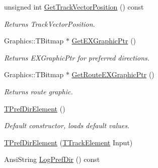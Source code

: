 \begin{DoxyCompactItemize}
\mbox{\label{class_t_pref_dir_element_a0edec31fc9787847e3b6240bab91783c}} 
unsigned int \mbox{\hyperlink{class_t_pref_dir_element_a0edec31fc9787847e3b6240bab91783c}{Get\+Track\+Vector\+Position}} () const
\begin{DoxyCompactList}\small\item\em Returns Track\+Vector\+Position. \end{DoxyCompactList}\item 
\mbox{\label{class_t_pref_dir_element_a9fd01c7c6774198d7efe2c9e60ab59bf}} 
Graphics\+::\+T\+Bitmap $\ast$ \mbox{\hyperlink{class_t_pref_dir_element_a9fd01c7c6774198d7efe2c9e60ab59bf}{Get\+E\+X\+Graphic\+Ptr}} ()
\begin{DoxyCompactList}\small\item\em Returns E\+X\+Graphic\+Ptr for preferred directions. \end{DoxyCompactList}\item 
\mbox{\label{class_t_pref_dir_element_a9dfc04bfa3abf32eb043d771381f971a}} 
Graphics\+::\+T\+Bitmap $\ast$ \mbox{\hyperlink{class_t_pref_dir_element_a9dfc04bfa3abf32eb043d771381f971a}{Get\+Route\+E\+X\+Graphic\+Ptr}} ()
\begin{DoxyCompactList}\small\item\em Returns route graphic. \end{DoxyCompactList}\item 
\mbox{\label{class_t_pref_dir_element_ab65391b0967a01b2d1b6450ff5ee85a7}} 
\mbox{\hyperlink{class_t_pref_dir_element_ab65391b0967a01b2d1b6450ff5ee85a7}{T\+Pref\+Dir\+Element}} ()
\begin{DoxyCompactList}\small\item\em Default constructor, loads default values. \end{DoxyCompactList}\item 
\mbox{\hyperlink{class_t_pref_dir_element_a0a06cd720bbc8e23a24d2e3b62f37de5}{T\+Pref\+Dir\+Element}} (\mbox{\hyperlink{class_t_track_element}{T\+Track\+Element}} Input)
\item 
\mbox{\label{class_t_pref_dir_element_a473c0faabe4d0fb8c4296c9c70dbe7d3}} 
Ansi\+String \mbox{\hyperlink{class_t_pref_dir_element_a473c0faabe4d0fb8c4296c9c70dbe7d3}{Log\+Pref\+Dir}} () const

\end{DoxyCompactItemize}

